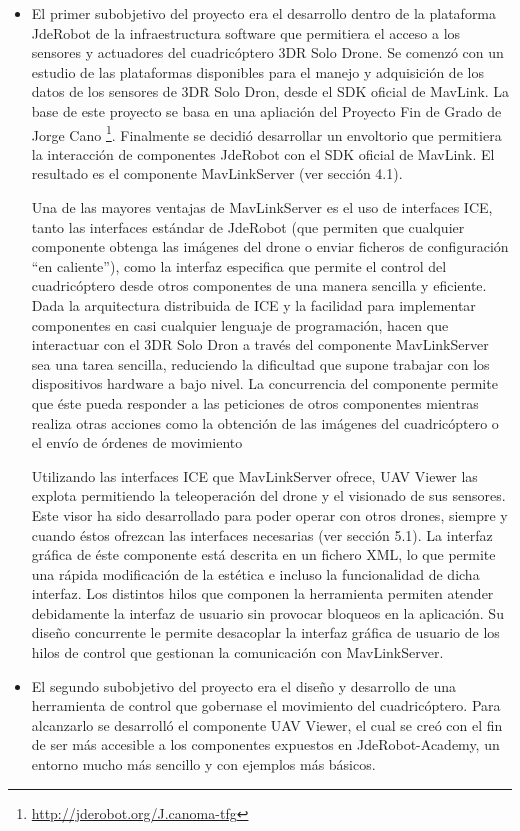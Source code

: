 \begin{itemize}
\item El primer subobjetivo del proyecto era el desarrollo dentro de la plataforma JdeRobot de la infraestructura software que permitiera el acceso a los sensores y actuadores del cuadricóptero 3DR Solo Drone. Se comenzó con un estudio de las plataformas disponibles para el manejo y adquisición de los datos de los sensores de 3DR Solo Dron, desde el SDK oficial de MavLink. La base de este proyecto se basa en una apliación del Proyecto Fin de Grado de Jorge Cano \footnote{\url{http://jderobot.org/J.canoma-tfg}}. Finalmente se decidió desarrollar un envoltorio que permitiera la interacción de componentes JdeRobot con el SDK oficial de MavLink. El resultado es el componente MavLinkServer (ver sección 4.1).

Una de las mayores ventajas de MavLinkServer es el uso de interfaces ICE, tanto las interfaces estándar de JdeRobot (que permiten que cualquier componente obtenga las imágenes del drone o enviar ficheros de configuración “en caliente”), como la interfaz especifica que permite el control del cuadricóptero desde otros componentes de una manera sencilla y eficiente. Dada la arquitectura
distribuida de ICE y la facilidad para implementar componentes en casi cualquier lenguaje de programación, hacen que interactuar con el 3DR Solo Dron a través del componente MavLinkServer sea una tarea sencilla, reduciendo la dificultad que supone trabajar con los dispositivos hardware a bajo nivel. La concurrencia del componente permite que éste pueda responder a las peticiones de otros
componentes mientras realiza otras acciones como la obtención de las imágenes del cuadricóptero o el envío de órdenes de movimiento

Utilizando las interfaces ICE que MavLinkServer ofrece, UAV Viewer las explota permitiendo la teleoperación del drone y el visionado de sus sensores. Este visor ha sido desarrollado para poder operar con otros drones, siempre y cuando éstos ofrezcan las interfaces necesarias (ver sección 5.1). La interfaz gráfica de éste componente está descrita en un fichero XML, lo que permite una rápida
modificación de la estética e incluso la funcionalidad de dicha interfaz. Los distintos hilos que componen la herramienta permiten atender debidamente la interfaz de usuario sin provocar bloqueos en la aplicación. Su diseño concurrente le permite desacoplar la interfaz gráfica de usuario de los hilos de control que gestionan la comunicación con MavLinkServer.

\item El segundo subobjetivo del proyecto era el diseño y desarrollo de una herramienta de control que gobernase el movimiento del cuadricóptero. Para alcanzarlo se desarrolló el componente UAV Viewer, el cual se creó con el fin de ser más accesible a los componentes expuestos en JdeRobot-Academy, un entorno mucho más sencillo y con ejemplos más básicos.  


\end{itemize}
